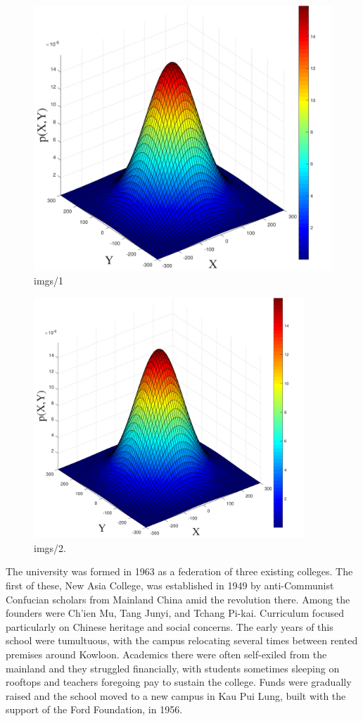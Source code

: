 \begin{figure}[t]
\centering
\includegraphics[width=4.5in]{imgs/1}
\caption{imgs/1}
\label{imgs/1}
\end{figure}

\begin{figure}[t]
\centering
\includegraphics[width=4in]{imgs/1}
\caption{imgs/2.}
\label{imgs/2}
\end{figure}

The university was formed in 1963 as a federation of three existing colleges. The first of these, New Asia College, was established in 1949 by anti-Communist Confucian scholars from Mainland China amid the revolution there. Among the founders were Ch'ien Mu, Tang Junyi, and Tchang Pi-kai. Curriculum focused particularly on Chinese heritage and social concerns. The early years of this school were tumultuous, with the campus relocating several times between rented premises around Kowloon. Academics there were often self-exiled from the mainland and they struggled financially, with students sometimes sleeping on rooftops and teachers foregoing pay to sustain the college. Funds were gradually raised and the school moved to a new campus in Kau Pui Lung, built with the support of the Ford Foundation, in 1956.

